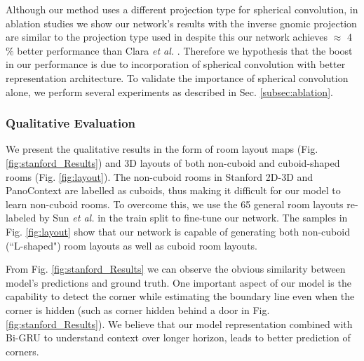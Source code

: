 \documentclass[final]{cvpr}
\begin{document}
Although our method uses a different projection type for spherical convolution, in ablation studies we show our network's results with the inverse gnomic projection are similar to the projection type used in \cite{fernandez2020corners} despite this our network achieves  $\approx$ 4$\%$ better performance than Clara \textit{et al.} \cite{fernandez2020corners}. Therefore we hypothesis that the boost in our performance is due to incorporation of spherical convolution with better representation architecture. To validate the importance of spherical convolution alone, we perform several experiments as described in Sec. \ref{subsec:ablation}.





\subsubsection{Qualitative Evaluation}\label{subsec:qualitative}

We present the qualitative results in the form of room layout maps (Fig.\ref{fig:stanford_Results}) and 3D layouts of both non-cuboid and cuboid-shaped rooms (Fig. \ref{fig:layout}). The non-cuboid rooms in Stanford 2D-3D \cite{armeni2017joint} and PanoContext \cite{zhang2014panocontext} are labelled as cuboids, thus making it difficult for our model to learn non-cuboid rooms. To overcome this, we use the 65 general room layouts re-labeled by Sun \textit{et al.} \cite{sun2019horizonnet} in the train split to fine-tune our network. The samples in Fig. \ref{fig:layout} show that our network is capable of generating both non-cuboid (``L-shaped") room layouts as well as cuboid room layouts. 

From Fig. \ref{fig:stanford_Results} we can observe the obvious similarity between model's predictions and ground truth. One important aspect of our model is the capability to detect the corner while estimating the boundary line even when the corner is hidden (such as corner hidden behind a door in Fig. \ref{fig:stanford_Results}). We believe that our model representation combined with Bi-GRU to understand context over longer horizon, leads to better prediction of corners.
\end{document}
